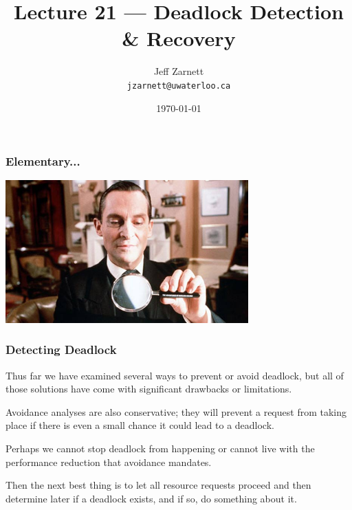 

\title{Lecture 21 --- Deadlock Detection \& Recovery }

\author{Jeff Zarnett \\ \small \texttt{jzarnett@uwaterloo.ca}}
\date{\today}




\begin{frame}
  \titlepage

 \end{frame}


\begin{frame}
\frametitle{Elementary...}

\begin{center}
	\includegraphics[width=0.7\textwidth]{images/jeremy-brett.jpg}
\end{center}

\end{frame}


\begin{frame}
\frametitle{Detecting Deadlock}

Thus far we have examined several ways to prevent or avoid deadlock, but all of those solutions have come with significant drawbacks or limitations. 

Avoidance analyses are also conservative; they will prevent a request from taking place if there is even a small chance it could lead to a deadlock. 

Perhaps we cannot stop deadlock from happening or cannot live with the performance reduction that avoidance mandates.

Then the next best thing is to let all resource requests proceed and then determine later if a deadlock exists, and if so, do something about it.

\end{frame}


